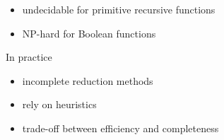 \documentclass{beamer}
\begin{document}
{\begin{itemize}
  \item<+-> undecidable for primitive recursive functions
  \item<+-> NP-hard for Boolean functions
  \end{itemize}
  \pause
  \begin{beamerboxesrounded}{In practice}
    \begin{itemize}
    \item<+-> \alert{incomplete} reduction methods
    \item<+-> rely on \alert{heuristics}
    \item<+-> trade-off between \alert{efficiency} and completeness 
    \end{itemize}
  \end{beamerboxesrounded}

}
\end{document}
